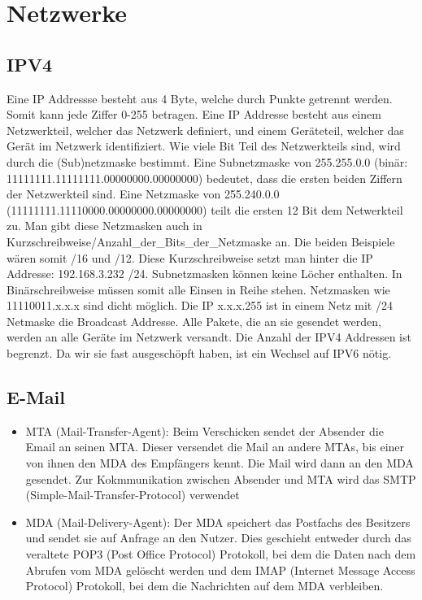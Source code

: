 \documentclass{article}
\begin{document}
\section*{Netzwerke}
\subsection*{IPV4}
Eine IP Addressse besteht aus 4 Byte, welche durch Punkte getrennt werden. Somit kann jede Ziffer 0-255 betragen.
Eine IP Addresse besteht aus einem Netzwerkteil, welcher das Netzwerk definiert, und einem Geräteteil, welcher das
Gerät im Netzwerk identifiziert. Wie viele Bit Teil des Netzwerkteils sind, wird durch die (Sub)netzmaske bestimmt.
Eine Subnetzmaske von 255.255.0.0 (binär: 11111111.11111111.00000000.00000000) bedeutet, dass die ersten beiden Ziffern 
der Netzwerkteil sind. Eine Netzmaske von 255.240.0.0 (11111111.11110000.00000000.00000000) teilt die ersten 12 Bit dem Netwerkteil
zu. Man gibt diese Netzmasken auch in Kurzschreibweise\newline /Anzahl\_der\_Bits\_der\_Netzmaske an. Die beiden Beispiele wären somit 
/16 und /12. Diese Kurzschreibweise setzt man hinter die IP Addresse: 192.168.3.232 /24. Subnetzmasken können keine Löcher enthalten.
In Binärschreibweise müssen somit alle Einsen in Reihe stehen. Netzmasken wie 11110011.x.x.x sind dicht möglich. Die IP 
x.x.x.255 ist in einem Netz mit /24 Netmaske die Broadcast Addresse. Alle Pakete, die an sie gesendet werden, werden an alle Geräte
im Netzwerk versandt. Die Anzahl der IPV4 Addressen ist begrenzt. Da wir sie fast ausgeschöpft haben, ist ein Wechsel auf IPV6 nötig.

\subsection*{E-Mail}
\begin{itemize}
    \item MTA (Mail-Transfer-Agent): Beim Verschicken sendet der Absender die Email an seinen MTA.
    Dieser versendet die Mail an andere MTAs, bis einer von ihnen den MDA des Empfängers kennt.
    Die Mail wird dann an den MDA gesendet. Zur Kokmmunikation zwischen Absender und MTA wird das
    SMTP (Simple-Mail-Transfer-Protocol) verwendet
    \item MDA (Mail-Delivery-Agent): Der MDA speichert das Postfachs des Besitzers und sendet sie auf 
    Anfrage an den Nutzer. Dies geschieht entweder durch das veraltete POP3 (Post Office Protocol) Protokoll,
    bei dem die Daten nach dem Abrufen vom MDA gelöscht werden und dem IMAP (Internet Message Access Protocol) Protokoll,
    bei dem die Nachrichten auf dem MDA verbleiben.
\end{itemize}
\end{document}
